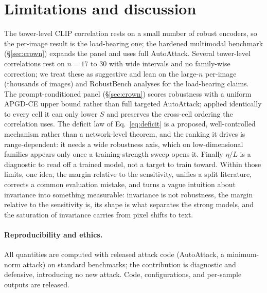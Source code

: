 \documentclass{article}
\theoremstyle{definition}
\newcommand{\etaL}{\eta/L}
\begin{document}
\section{Limitations and discussion}\label{sec:disc}
The tower-level CLIP correlation rests on a small number of robust encoders, so the per-image result is
the load-bearing one; the hardened multimodal benchmark (\S\ref{sec:crown}) expands the panel and uses
full AutoAttack. Several tower-level correlations rest on $n{=}17$ to $30$ with wide intervals and no
family-wise correction; we treat these as suggestive and lean on the large-$n$ per-image (thousands of
images) and RobustBench analyses for the load-bearing claims. The prompt-conditioned panel
(\S\ref{sec:crown}) scores robustness with a uniform APGD-CE upper bound rather than full targeted
AutoAttack; applied identically to every cell it can only lower $S$ and preserves the cross-cell ordering
the correlation uses. The deficit law of Eq.~\ref{eq:deficit} is a proposed, well-controlled mechanism rather
than a network-level theorem, and the ranking it drives is range-dependent: it needs a wide robustness
axis, which on low-dimensional families appears only once a training-strength sweep opens it. Finally
$\etaL$ is a diagnostic to read off a trained model, not a target to train toward. Within those limits, one idea, the margin relative to the
sensitivity, unifies a split literature, corrects a common evaluation mistake, and turns a vague
intuition about invariance into something measurable: invariance is not robustness, the margin relative
to the sensitivity is, its shape is what separates the strong models, and the saturation of invariance
carries from pixel shifts to text.

\paragraph{Reproducibility and ethics.} All quantities are computed with released attack code
(AutoAttack, a minimum-norm attack) on standard benchmarks; the contribution is diagnostic and
defensive, introducing no new attack. Code, configurations, and per-sample outputs are released.




\appendix


\end{document}
